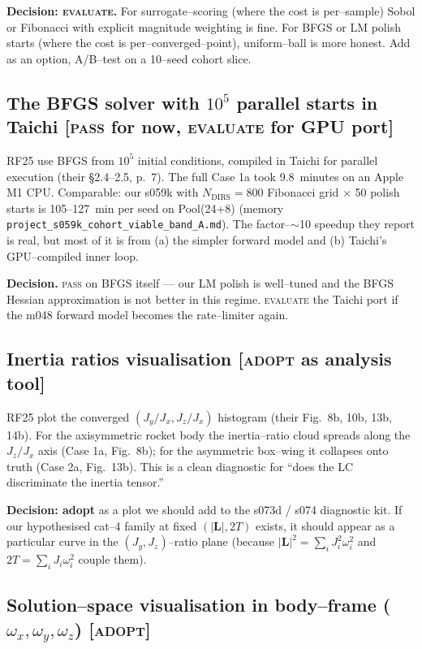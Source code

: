 \documentclass[11pt]{article}
\newcommand{\Lvec}{\mathbf{L}}
\newcommand{\ttt}[1]{\texttt{#1}}
\begin{document}
\textbf{Decision: \textsc{evaluate}.} For surrogate--scoring (where the cost
is per--sample) Sobol or Fibonacci with explicit magnitude weighting is fine.
For BFGS or LM polish starts (where the cost is per--converged--point),
uniform--ball is more honest. Add as an option, A/B--test on a 10--seed cohort
slice.

\subsection{The BFGS solver with $10^5$ parallel starts in Taichi \textnormal{[\textsc{pass} for now, \textsc{evaluate} for GPU port]}}

\noindent
RF25 use BFGS from $10^5$ initial conditions, compiled in Taichi for parallel
execution (their \S2.4--2.5, p.~7). The full Case 1a took 9.8~minutes on an
Apple M1 CPU. Comparable: our s059k with $N_{\mathrm{DIRS}}=800$ Fibonacci grid
$\times$ 50 polish starts is 105--127~min per seed on Pool(24+8) (memory
\ttt{project\_s059k\_cohort\_viable\_band\_A.md}). The factor--$\sim$10
speedup they report is real, but most of it is from (a) the simpler forward
model and (b) Taichi's GPU--compiled inner loop.

\textbf{Decision.} \textsc{pass} on BFGS itself --- our LM polish is well--tuned
and the BFGS Hessian approximation is not better in this regime. \textsc{evaluate}
the Taichi port if the m048 forward model becomes the rate--limiter again.

\subsection{Inertia ratios visualisation \textnormal{[\textsc{adopt} as analysis tool]}}

\noindent
RF25 plot the converged $(J_y/J_x, J_z/J_x)$ histogram (their Fig.~8b, 10b,
13b, 14b). For the axisymmetric rocket body the inertia--ratio cloud spreads
along the $J_z/J_x$ axis (Case 1a, Fig.~8b); for the asymmetric box--wing it
collapses onto truth (Case 2a, Fig.~13b). This is a clean diagnostic for
``does the LC discriminate the inertia tensor.''

\textbf{Decision: adopt} as a plot we should add to the s073d / s074
diagnostic kit. If our hypothesised cat--4 family at fixed $(|\Lvec|, 2T)$
exists, it should appear as a particular curve in the $(J_y, J_z)$--ratio
plane (because $|\Lvec|^2 = \sum_i J_i^2 \omega_i^2$ and $2T = \sum_i J_i
\omega_i^2$ couple them).

\subsection{Solution--space visualisation in body--frame ($\omega_x, \omega_y, \omega_z$) \textnormal{[\textsc{adopt}]}}
\end{document}
